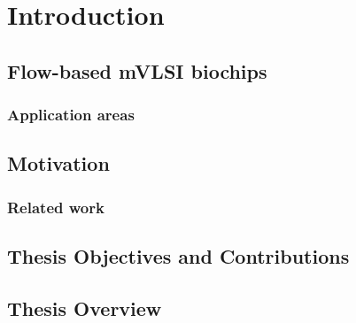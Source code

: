 \chapter{Introduction}


\section{Flow-based mVLSI biochips}

\subsection{Application areas}

\section{Motivation}

\subsection{Related work}

\section{Thesis Objectives and Contributions}

\section{Thesis Overview}



